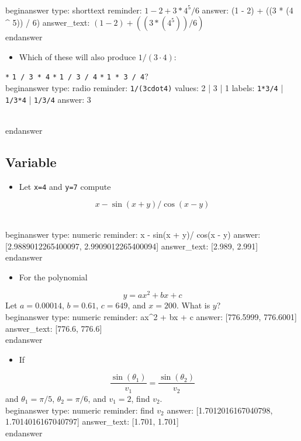 \documentclass[12pt]{article}
\begin{document}
\\begin{answer}
type: shorttext
reminder: \( 1 - 2 + 3 * 4 ^ 5 / 6 \)
answer: (1 - 2) + ((3 * (4 ^ 5)) / 6)
answer_text: \( (1 - 2) + ((3 * (4 ^ 5)) / 6) \) 
\\end{answer}
\begin{itemize}\item Which of these will also produce $1/(3\cdot4)$:\end{itemize}\newline
\texttt{*} \texttt{1 / 3 * 4}\newline
\texttt{*} \texttt{1 / 3 / 4}\newline
\texttt{*} \texttt{1 * 3 / 4}?
\\begin{answer}
type: radio
reminder: \verb+1/(3cdot4)+
values: 2 | 3 | 1
labels: \verb+1*3/4+ | \verb+1/3*4+ | \verb+1/3/4+
answer: 3

\\end{answer}
\subsection{Variable}\begin{itemize}\item Let \texttt{x=4} and \texttt{y=7} compute\end{itemize}
$$
x - \sin(x + y)/\cos(x - y)
$$

\\begin{answer}
    type: numeric
    reminder: x - sin(x + y)/ cos(x - y)
    answer: [2.9889012265400097, 2.9909012265400094]
    answer_text: [2.989, 2.991] 
\\end{answer}
\begin{itemize}\item For the polynomial\end{itemize}
$$
y = ax^2 + bx + c
$$
\newline
Let $a=0.00014$, $b=0.61$, $c=649$, and $x=200$. What is $y$?
\\begin{answer}
    type: numeric
    reminder: ax^2 + bx + c
    answer: [776.5999, 776.6001]
    answer_text: [776.6, 776.6] 
\\end{answer}
\begin{itemize}\item If \end{itemize}
$$
\frac{\sin(\theta_1)}{v_1} = \frac{\sin(\theta_2)}{v_2}
$$
\newline
and $\theta_1 = \pi/5$, $\theta_2 = \pi/6$, and $v_1=2$, find $v_2$.
\\begin{answer}
    type: numeric
    reminder: find \(v_2\)
    answer: [1.7012016167040798, 1.7014016167040797]
    answer_text: [1.701, 1.701] 
\\end{answer}
\end{document}
